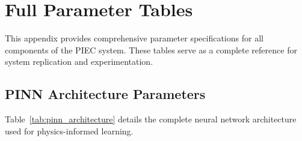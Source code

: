 \chapter{Full Parameter Tables}
\label{appendix:parameters}

This appendix provides comprehensive parameter specifications for all components of the PIEC system. These tables serve as a complete reference for system replication and experimentation.

\section{PINN Architecture Parameters}
\label{sec:pinn_params}

Table~\ref{tab:pinn_architecture} details the complete neural network architecture used for physics-informed learning.

